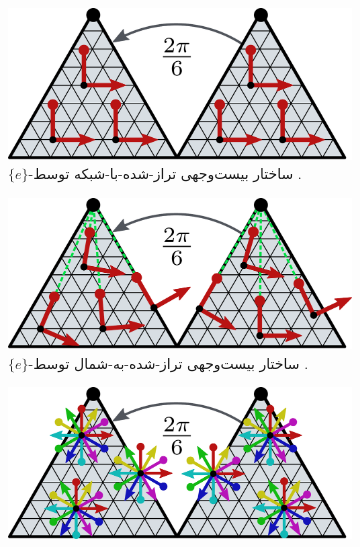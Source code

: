\begin{figure}
	\centering
	\begin{subfigure}[b]{0.31\textwidth}
		\centering
		\includegraphics[width=1.\textwidth]{figures/icosahedron_G_structure_1.pdf}
		\vspace*{-6pt}
		\captionsetup{width=.9\textwidth}
		\caption{\small
			$\{e\}$-ساختار بیست‌وجهی تراز-شده-با-شبکه توسط \citet{liu2018icoAltAz}.
		}
		\label{fig:G_structure_ico_1}
	\end{subfigure}
	\hfill
	\begin{subfigure}[b]{0.31\textwidth}
		\centering
		\includegraphics[width=1.\textwidth]{figures/icosahedron_G_structure_2.pdf}
		\vspace*{-6pt}
		\captionsetup{width=.9\textwidth}
		\caption{\small
			$\{e\}$-ساختار بیست‌وجهی تراز-شده-به-شمال توسط \citet{zhang2019orientation}.
		}
		\label{fig:G_structure_ico_2}
	\end{subfigure}
	\hfill
	\begin{subfigure}[b]{0.31\textwidth}
		\centering
		\includegraphics[width=1.\textwidth]{figures/icosahedron_G_structure_3.pdf}

\end{subfigure}
\end{figure}
